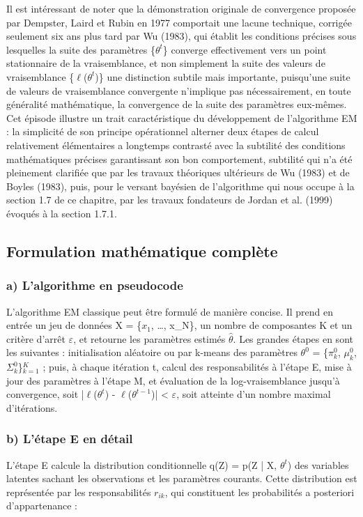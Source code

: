 Il est intéressant de noter que la démonstration originale de convergence proposée par Dempster, Laird et Rubin en 1977 comportait une lacune technique, corrigée seulement six ans plus tard par Wu (1983), qui établit les conditions précises sous lesquelles la suite des paramètres \{$\theta ^{t}$\} converge effectivement vers un point stationnaire de la vraisemblance, et non simplement la suite des valeurs de vraisemblance \{$\ell $($\theta ^{t}$)\}  une distinction subtile mais importante, puisqu'une suite de valeurs de vraisemblance convergente n'implique pas nécessairement, en toute généralité mathématique, la convergence de la suite des paramètres eux-mêmes. Cet épisode illustre un trait caractéristique du développement de l'algorithme EM : la simplicité de son principe opérationnel  alterner deux étapes de calcul relativement élémentaires  a longtemps contrasté avec la subtilité des conditions mathématiques précises garantissant son bon comportement, subtilité qui n'a été pleinement clarifiée que par les travaux théoriques ultérieurs de Wu (1983) et de Boyles (1983), puis, pour le versant bayésien de l'algorithme qui nous occupe à la section 1.7 de ce chapitre, par les travaux fondateurs de Jordan et al. (1999) évoqués à la section 1.7.1.

\subsection{Formulation mathématique complète}
\subsubsection{a) L'algorithme en pseudocode}
L'algorithme EM classique peut être formulé de manière concise. Il prend en entrée un jeu de données X = \{$x_{1}$, \ldots{}, x\_N\}, un nombre de composantes K et un critère d'arrêt $\varepsilon $, et retourne les paramètres estimés $\hat{\theta }$. Les grandes étapes en sont les suivantes : initialisation aléatoire ou par k-means des paramètres $\theta ^{0}$ = \{$\pi _{k}^{0}$, $\mu _{k}^{0}$, $\Sigma _{k}^{0}$\}$_{k=1}^{K}$ ; puis, à chaque itération t, calcul des responsabilités à l'étape E, mise à jour des paramètres à l'étape M, et évaluation de la log-vraisemblance jusqu'à convergence, soit |$\ell $($\theta ^{t}$) - $\ell $($\theta ^{t-1}$)| < $\varepsilon $, soit atteinte d'un nombre maximal d'itérations.

\subsubsection{b) L'étape E en détail}
L'étape E calcule la distribution conditionnelle q(Z) = p(Z | X, $\theta ^{t}$) des variables latentes sachant les observations et les paramètres courants. Cette distribution est représentée par les responsabilités $r_{ik}$, qui constituent les probabilités a posteriori d'appartenance :

